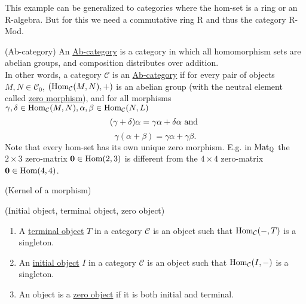 This example can be generalized to categories where the hom-set is a ring or an R-algebra. But for this we need a commutative ring R and thus
the category R-Mod.

\begin{definition}{(Ab-category)}
An \ul{Ab-category} is a category in which all homomorphism sets are abelian groups, and composition distributes over addition.\\
In other words, a category $\mathcal{C}$ is an \ul{Ab-category} if for every pair of objects $M,N \in \mathcal{C}_{0}$,
$( \textup{Hom}_{\mathcal{C}}(M,N), + )$ is an abelian group (with the neutral element called \ul{zero morphism}),
and for all morphisms $\gamma, \delta \in \textup{Hom}_{\mathcal{C}}(M,N),
\alpha, \beta \in \textup{Hom}_{\mathcal{C}}(N,L)$
\[
(\gamma + \delta)\alpha = \gamma\alpha + \delta\alpha \textup{ and }\]\[
\gamma(\alpha+\beta) = \gamma\alpha + \gamma\beta.
\]
Note that every hom-set has its own unique zero morphism. E.g. in $\textup{Mat}_{\mathbb{Q}}$ the $2 \times 3$ zero-matrix
$\mathbf{0} \in \textup{Hom}(2,3)$ is different from the $4 \times 4$ zero-matrix $\mathbf{0} \in \textup{Hom}(4,4)$.
\end{definition}

\begin{definition}{(Kernel of a morphism)}

\end{definition}

\begin{definition}{(Initial object, terminal object, zero object)}\label{def:init_term_zero_object}
\renewcommand{\labelenumi}{(\theenumi)}
\begin{enumerate}
\item A \ul{terminal object} $T$ in a category $\mathcal{C}$ is an object such that $\textup{Hom}_{\mathcal{C}}(-,T)$ is a singleton.
\item An \ul{initial object} $I$ in a category $\mathcal{C}$ is an object such that $\textup{Hom}_{\mathcal{C}}(I,-)$ is a singleton.
\item An object is a \ul{zero object} if it is both initial and terminal.
\end{enumerate}
\end{definition}

